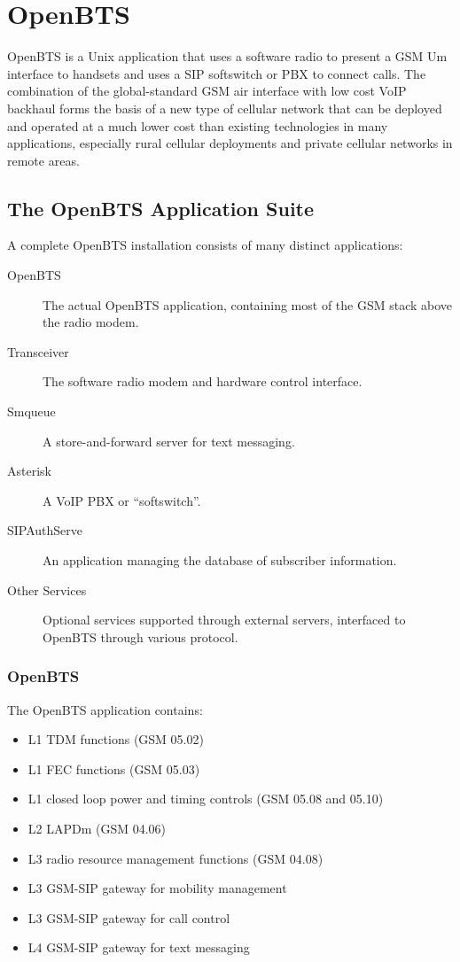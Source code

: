 \chapter{OpenBTS}

OpenBTS is a Unix application that uses a software radio to present a GSM Um interface 
to handsets and uses a SIP softswitch or PBX to connect calls.
The combination of the global-standard GSM air interface with low cost VoIP backhaul 
forms the basis of a new type of cellular network that can be deployed and operated at a much lower
cost than existing technologies in many applications, 
especially rural cellular deployments and private cellular networks in remote areas.

\section{The OpenBTS Application Suite}
A complete OpenBTS installation consists of many distinct applications:

\begin{description}
\item[OpenBTS] The actual OpenBTS application, containing most of the GSM stack above the radio modem.
\item[Transceiver] The software radio modem and hardware control interface.
\item[Smqueue] A store-and-forward server for text messaging.
\item[Asterisk] A VoIP PBX or ``softswitch''.
\item[SIPAuthServe] An application managing the database of subscriber information.
\item[Other Services] Optional services supported through external servers, interfaced to OpenBTS through
various protocol.

\end{description}


\subsection{OpenBTS}
The OpenBTS application contains:
\begin{itemize}
\item L1 TDM functions (GSM 05.02)
\item L1 FEC functions (GSM 05.03)
\item L1 closed loop power and timing controls (GSM 05.08 and 05.10)
\item L2 LAPDm (GSM 04.06)
\item L3 radio resource management functions (GSM 04.08)
\item L3 GSM-SIP gateway for mobility management
\item L3 GSM-SIP gateway for call control
\item L4 GSM-SIP gateway for text messaging
\end{itemize}

